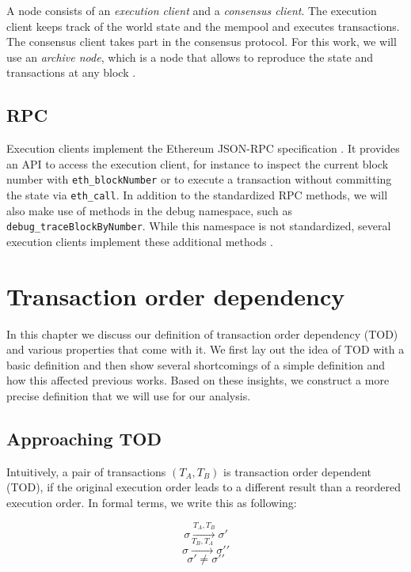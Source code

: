 \documentclass[draft,final]{vutinfth} %
\begin{document}
A node consists of an \emph{execution client} and a \emph{consensus client}. The execution client keeps track of the world state and the mempool and executes transactions. The consensus client takes part in the consensus protocol. For this work, we will use an \emph{archive node}, which is a node that allows to reproduce the state and transactions at any block \cite{noauthor_nodes_2024}.

\section{RPC}

Execution clients implement the Ethereum JSON-RPC specification \cite{noauthor_ethereum_2024}. It provides an API to access the execution client, for instance to inspect the current block number with \verb|eth_blockNumber| or to execute a transaction without committing the state via \verb|eth_call|. In addition to the standardized RPC methods, we will also make use of methods in the debug namespace, such as \verb|debug_traceBlockByNumber|. While this namespace is not standardized, several execution clients implement these additional methods \cite{noauthor_debug_2024}\cite{noauthor_rpc_2024}\cite{noauthor_reth_2024}.

\chapter{Transaction order dependency}

In this chapter we discuss our definition of transaction order dependency (TOD) and various properties that come with it. We first lay out the idea of TOD with a basic definition and then show several shortcomings of a simple definition and how this affected previous works. Based on these insights, we construct a more precise definition that we will use for our analysis.

\section{Approaching TOD}

Intuitively, a pair of transactions $(T_A, T_B)$ is transaction order dependent (TOD), if the original execution order leads to a different result than a reordered execution order. In formal terms, we write this as following:

$$\sigma \xrightarrow{T_A, T_B} \sigma \prime$$
$$\sigma \xrightarrow{T_B, T_A} \sigma \prime \prime$$
$$\sigma \prime \neq \sigma \prime \prime$$
\end{document}
